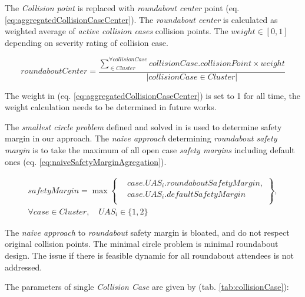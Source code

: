 The \emph{Collision point} is replaced with \emph{roundabout center} point (eq. \ref{eq:aggregatedCollisionCaseCenter}). The \emph{roundabout center} is calculated as weighted average of \emph{active collision cases} collision points. The $weight \in [0,1]$ depending on severity rating of collision case.

\begin{equation}\label{eq:aggregatedCollisionCaseCenter}
    roundaboutCenter=\frac{\sum_{ \in Cluster}^{\forall collisionCase} collisionCase.collisionPoint \times weight}{\left | collisionCase \in Cluster \right |}
\end{equation}

\begin{note}
    The weight in (eq. \ref{eq:aggregatedCollisionCaseCenter}) is set to 1 for all time, the weight calculation needs to be determined in future works. 
\end{note}

The \emph{smallest circle problem} defined and solved in \cite{ritter1990efficient,welzl1991smallest} is used to determine safety margin in our approach. The \emph{naive approach} determining \emph{roundabout safety margin} is to take the maximum of all open case \emph{safety margins} including default ones (eq. \ref{eq:naiveSafetyMarginAgregation}).

\begin{multline}\label{eq:naiveSafetyMarginAgregation}
    safetyMargin = \max \left\{\begin{aligned}&case.UAS_i.roundabout Safety Margin,\\&case.UAS_i.default Safety Margin\\\end{aligned}\right \},\\
    \forall case \in Cluster,\quad UAS_i \in \{1,2\}
\end{multline}

\begin{note}
    The \emph{naive approach} to \emph{roundabout} safety margin is bloated, and do not respect original collision points. The minimal circle problem is minimal roundabout design. The issue if there is feasible dynamic for all roundabout attendees is not addressed. 
\end{note}

The parameters of single \emph{Collision Case} are given by (tab. \ref{tab:collisionCase}):

